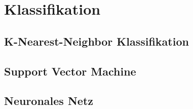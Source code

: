 \chapter{Klassifikation}
\section{K-Nearest-Neighbor Klassifikation}
\section{Support Vector Machine}
\section{Neuronales Netz}
